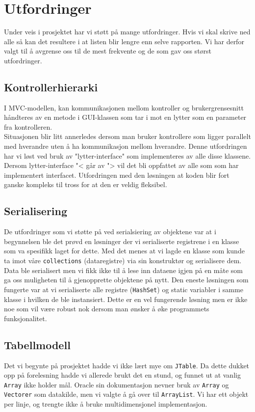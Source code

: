 \section{Utfordringer}
Under veis i prosjektet har vi støtt på mange utfordringer. Hvis vi skal skrive ned alle så kan det resultere i at listen blir lengre enn selve rapporten. Vi har derfor valgt til å avgrense oss til de mest frekvente og de som gav oss størst utfordringer.

\subsection{Kontrollerhierarki}
I MVC-modellen, kan kommunikasjonen mellom kontroller og brukergrensesnitt håndteres av en metode i GUI-klassen som tar i mot en lytter som en parameter fra kontrolleren. \\
Situasjonen blir litt annerledes dersom man bruker kontrollere som ligger parallelt med hverandre uten å ha kommunikasjon mellom hverandre. Denne utfordringen har vi løst ved bruk av "lytter-interface" som implementeres av alle disse klassene. Dersom lytter-interface "< går av "> vil det bli oppfattet av alle som som har implementert interfacet. Utfordringen med den løsningen at koden blir fort ganske kompleks til tross for at den er veldig fleksibel. 
\subsection{Serialisering}
De utfordringer som vi støtte på ved serialsiering av objektene var at i begynnelsen ble det prøvd en løsninger der vi serialiserte registrene i en klasse som va spesifikk laget for dette. Med det menes at vi lagde en klasse som kunde ta imot våre \texttt{collections} (dataregistre) via sin konstruktør og serialisere dem. Data ble serialisert men vi fikk ikke til å lese inn dataene igjen på en måte som ga oss muligheten til å gjenopprette objektene på nytt. Den eneste løsningen som fungerte var at vi serialiserte alle registre (\texttt{HashSet}) og static variabler i samme klasse i hvilken de ble instansiert. Dette er en vel fungerende løsning men er ikke noe som vil være robust nok dersom man ønsker å øke programmets funksjonalitet. 


\subsection{Tabellmodell}
Det vi begynte på prosjektet hadde vi ikke lært mye om \texttt{JTable}. Da dette dukket opp på forelesning hadde vi allerede brukt det en stund, og funnet ut at vanlig \texttt{Array} ikke holder mål. Oracle sin dokumentasjon nevner bruk av \texttt{Array} og \texttt{Vectorer} som datakilde, men vi valgte å gå over til \texttt{ArrayList}. Vi har ett objekt per linje, og trengte ikke å bruke multidimensjonel implementasjon.

